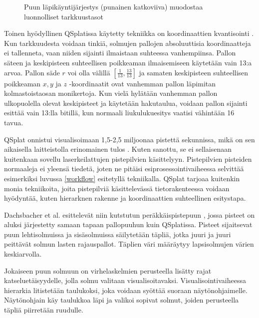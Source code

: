 \begin{figure}
    \centering
    
    \caption{Puun läpikäyntijärjestys (punainen katkoviiva) muodostaa luonnolliset tarkkuustasot}
    \label{tarkkuustasot}
\end{figure}

Toinen hyödyllinen QSplatissa käytetty tekniikka on koordinaattien kvantisointi . Kun tarkkuudesta voidaan tinkiä, solmujen pallojen absoluuttisia koordinaatteja ei tallenneta, vaan niiden sijainti ilmaistaan suhteessa vanhempiinsa. Pallon säteen ja keskipisteen suhteellisen poikkeaman ilmaisemiseen käytetään vain 13:a arvoa. Pallon säde $r$ voi olla välillä $[\frac{1}{13}, \frac{13}{13}]$ ja samaten keskipisteen suhteellisen poikkeaman $x, y$ ja $z$ -koordinaatit ovat vanhemman pallon läpimitan kolmastoistaosan monikertoja. Kun vielä hylätään vanhemman pallon ulkopuolella olevat keskipisteet ja käytetään hakutaulua, voidaan pallon sijainti esittää vain 13:lla bitillä, kun normaali liukulukuesitys vaatisi vähintään 16 tavua. \cite{qsplat}

QSplat onnistui visualisoimaan 1,5-2,5 miljoonaa pistettä sekunnissa, mikä on sen aikaisella laitteistolla erinomainen tulos \cite{qsplat}. Kuten sanottu, se ei sellaisenaan kuitenkaan sovellu laserkeilattujen pistepilvien käsittelyyn. Pistepilvien pisteiden normaaleja ei yleensä tiedetä, joten ne pitäisi esiprosessointivaiheessa selvittää esimerkiksi luvussa \ref{workflow} esitetyllä tekniikalla. QSplat tarjoaa kuitenkin monia tekniikoita, joita pistepilviä käsittelevässä tietorakenteessa voidaan hyödyntää, kuten hierarknen rakenne ja koordinaattien suhteellinen esitystapa.



\subtitle{Peräkkäispistepuut}
Dachsbacher et al. esittelevät niin kutstutun peräkkäispistepuun , jossa pisteet on aluksi järjestetty samaan tapaan pallopuuhun kuin QSplatissa. Pisteet sijaitsevat puun lehtisolmuissa ja sisäsolmuissa säilytetään täpliä, jotka juuri ja juuri peittävät solmun lasten rajauspallot. Täplien väri määräytyy lapsisolmujen värien keskiarvolla. \cite{spt}

Jokaiseen puun solmuun on virhelaskelmien perusteella lisätty rajat katseluetäisyydelle, jolla solmu valitaan visualisoitavaksi. Visualisointivaiheessa hierarkia litistetään taulukoksi, joka voidaan syöttää suoraan näytönohjaimelle. Näytönohjain käy taulukkoa läpi ja valikoi sopivat solmut, joiden perusteella täpliä piirretään ruudulle. \cite{spt}

